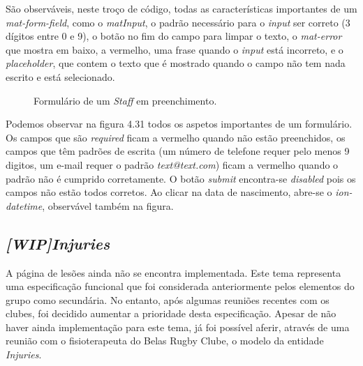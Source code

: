 São observáveis, neste troço de código, todas as características importantes de um \textit{mat-form-field}, como o \textit{matInput}, o padrão necessário para o \textit{input} ser correto (3 dígitos entre 0 e 9), o botão no fim do campo para limpar o texto, o \textit{mat-error} que mostra em baixo, a vermelho, uma frase quando o \textit{input} está incorreto, e o \textit{placeholder}, que contem o texto que é mostrado quando o campo não tem nada escrito e está selecionado.

\begin{figure}[h]
	\begin{center}
	\end{center}
	\caption{Formulário de um \textit{Staff} em preenchimento.}\label{fig:formpost}
\end{figure}

Podemos observar na figura 4.31 todos os aspetos importantes de um formulário. Os campos que são \textit{required} ficam a vermelho quando não estão preenchidos, os campos que têm padrões de escrita (um número de telefone requer pelo menos 9 digitos, um e-mail requer o padrão \textit{text@text.com}) ficam a vermelho quando o padrão não é cumprido corretamente. O botão \textit{submit} encontra-se \textit{disabled} pois os campos não estão todos corretos. Ao clicar na data de nascimento, abre-se o \textit{ion-datetime}, observável também na figura.


\subsection{\textit{[WIP]Injuries}}\label{subsec428}
A página de lesões ainda não se encontra implementada. Este tema representa uma especificação funcional que foi considerada anteriormente pelos elementos do grupo como secundária. No entanto, após algumas reuniões recentes com os clubes, foi decidido aumentar a prioridade desta especificação. Apesar de não haver ainda implementação para este tema, já foi possível aferir, através de uma reunião com o fisioterapeuta do Belas Rugby Clube, o modelo da entidade \textit{Injuries}.\\

